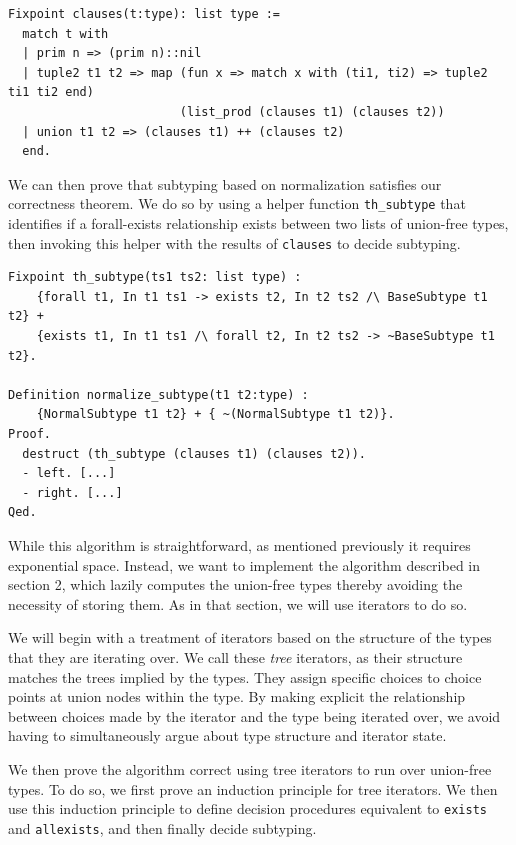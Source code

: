 \documentclass[a4paper,english]{lipics-v2019}
\begin{document}
\begin{small}\begin{verbatim}
Fixpoint clauses(t:type): list type :=
  match t with
  | prim n => (prim n)::nil
  | tuple2 t1 t2 => map (fun x => match x with (ti1, ti2) => tuple2 ti1 ti2 end)
                        (list_prod (clauses t1) (clauses t2))
  | union t1 t2 => (clauses t1) ++ (clauses t2)
  end.
\end{verbatim}\end{small}

We can then prove that subtyping based on normalization satisfies our correctness
theorem. We do so by using a helper function \verb|th_subtype| that identifies if
a forall-exists relationship exists between two lists of union-free types, then invoking
this helper with the results of \verb|clauses| to decide subtyping.
\begin{small}\begin{verbatim}
Fixpoint th_subtype(ts1 ts2: list type) : 
    {forall t1, In t1 ts1 -> exists t2, In t2 ts2 /\ BaseSubtype t1 t2} +
    {exists t1, In t1 ts1 /\ forall t2, In t2 ts2 -> ~BaseSubtype t1 t2}.

Definition normalize_subtype(t1 t2:type) : 
    {NormalSubtype t1 t2} + { ~(NormalSubtype t1 t2)}.
Proof.
  destruct (th_subtype (clauses t1) (clauses t2)).
  - left. [...]
  - right. [...]
Qed.
\end{verbatim}\end{small}

While this algorithm is straightforward, as mentioned previously it requires
exponential space. Instead, we want to implement the algorithm described in section 2,
which lazily computes the union-free types thereby avoiding the necessity of storing them.
As in that section, we will use iterators to do so.

We will begin with a treatment of iterators based on the structure of the
types that they are iterating over. We call these \emph{tree} iterators, as
their structure matches the trees implied by the types. They assign specific
choices to choice points at union nodes within the type. By making explicit
the relationship between choices made by the iterator and the type being
iterated over, we avoid having to simultaneously argue about type structure and 
iterator state.

We then prove the algorithm correct using tree iterators to run over union-free
types. To do so, we first prove an induction principle for tree iterators. We then
use this induction principle to define decision procedures equivalent to \verb|exists|
and \verb|allexists|, and then finally decide subtyping.
\end{document}
